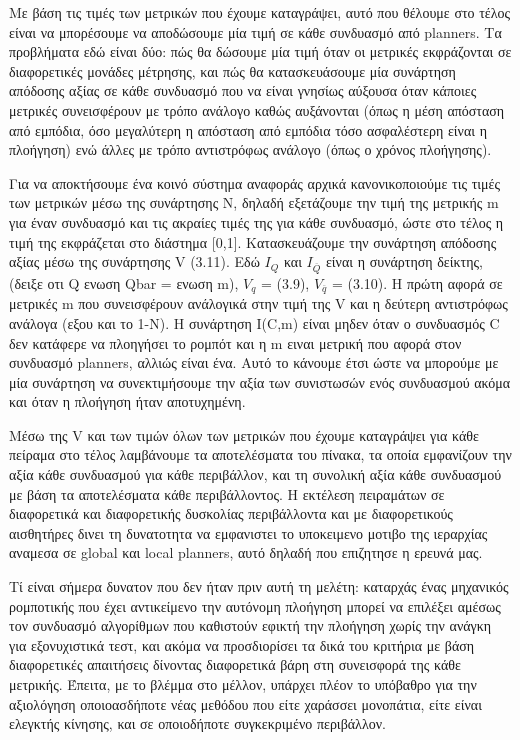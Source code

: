 \documentclass[a4paper,10pt]{article}
\begin{document}
Με βάση τις τιμές των μετρικών που έχουμε καταγράψει, αυτό που θέλουμε στο
τέλος είναι να μπορέσουμε να αποδώσουμε μία τιμή σε κάθε συνδυασμό από
planners.  Τα προβλήματα εδώ είναι δύο: πώς θα δώσουμε μία τιμή όταν οι
μετρικές εκφράζονται σε διαφορετικές μονάδες μέτρησης, και πώς θα
κατασκευάσουμε μία συνάρτηση απόδοσης αξίας σε κάθε συνδυασμό που να είναι
γνησίως αύξουσα όταν κάποιες μετρικές συνεισφέρουν με τρόπο ανάλογο καθώς
αυξάνονται (όπως η μέση απόσταση από εμπόδια, όσο μεγαλύτερη η απόσταση από
εμπόδια τόσο ασφαλέστερη είναι η πλοήγηση) ενώ άλλες με τρόπο αντιστρόφως
ανάλογο (όπως ο χρόνος πλοήγησης).

Για να αποκτήσουμε ένα κοινό σύστημα αναφοράς αρχικά κανονικοποιούμε τις τιμές
των μετρικών μέσω της συνάρτησης N, δηλαδή εξετάζουμε την τιμή της
μετρικής m για έναν συνδυασμό και τις ακραίες τιμές της για κάθε συνδυασμό,
ώστε στο τέλος η τιμή της εκφράζεται στο διάστημα [0,1]. Κατασκευάζουμε την
συνάρτηση απόδοσης αξίας μέσω της συνάρτησης V (3.11).  Εδώ $I_Q$ και
$I_\overline{Q}$ είναι η συνάρτηση δείκτης, (δειξε οτι Q ενωση Qbar = ενωση m),
$V_q$ = (3.9), $V_\overline{q}$ = (3.10). H πρώτη αφορά σε μετρικές m που
συνεισφέρουν ανάλογικά στην τιμή της V και η δεύτερη αντιστρόφως ανάλογα (εξου
και το 1-N).  Η συνάρτηση I(C,m) είναι μηδεν όταν ο συνδυασμός C δεν κατάφερε
να πλοηγήσει το ρομπότ και η m ειναι μετρική που αφορά στον συνδυασμό planners,
αλλιώς είναι ένα.  Αυτό το κάνουμε έτσι ώστε να μπορούμε με μία συνάρτηση να
συνεκτιμήσουμε την αξία των συνιστωσών ενός συνδυασμού ακόμα και όταν η
πλοήγηση ήταν αποτυχημένη.

Μέσω της V και των τιμών όλων των μετρικών που έχουμε καταγράψει για κάθε
πείραμα στο τέλος λαμβάνουμε τα αποτελέσματα του πίνακα, τα οποία εμφανίζουν
την αξία κάθε συνδυασμού για κάθε περιβάλλον, και τη συνολική αξία κάθε
συνδυασμού με βάση τα αποτελέσματα κάθε περιβάλλοντος. Η εκτέλεση πειραμάτων σε
διαφορετικά και διαφορετικής δυσκολίας περιβάλλοντα και με διαφορετικούς
αισθητήρες δινει τη δυνατοτητα να εμφανιστει το υποκειμενο μοτιβο της ιεραρχίας
αναμεσα σε global και local planners, αυτό δηλαδή που επιζητησε η ερευνά μας.

Τί είναι σήμερα δυνατον που δεν ήταν πριν αυτή τη μελέτη:
καταρχάς ένας μηχανικός ρομποτικής που έχει αντικείμενο την αυτόνομη πλοήγηση
μπορεί να επιλέξει αμέσως τον συνδυασμό αλγορίθμων που καθιστούν εφικτή
την πλοήγηση χωρίς την ανάγκη για εξονυχιστικά τεστ, και ακόμα να προσδιορίσει
τα δικά του κριτήρια με βάση διαφορετικές απαιτήσεις δίνοντας διαφορετικά βάρη
στη συνεισφορά της κάθε μετρικής. Έπειτα, με το βλέμμα στο μέλλον, υπάρχει
πλέον το υπόβαθρο για την αξιολόγηση οποιοασδήποτε νέας μεθόδου που είτε
χαράσσει μονοπάτια, είτε είναι ελεγκτής κίνησης, και σε οποιοδήποτε
συγκεκριμένο περιβάλλον.
\end{document}
